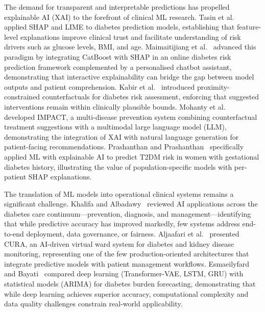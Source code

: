 \documentclass[conference]{IEEEtran}
\begin{document}
The demand for transparent and interpretable predictions has propelled explainable AI (XAI) to the forefront of clinical ML research. Tasin et al.~\cite{b5} applied SHAP and LIME to diabetes prediction models, establishing that feature-level explanations improve clinical trust and facilitate understanding of risk drivers such as glucose levels, BMI, and age. Maimaitijiang et al.~\cite{b9} advanced this paradigm by integrating CatBoost with SHAP in an online diabetes risk prediction framework complemented by a personalised chatbot assistant, demonstrating that interactive explainability can bridge the gap between model outputs and patient comprehension. Kabir et al.~\cite{b10} introduced proximity-constrained counterfactuals for diabetes risk assessment, enforcing that suggested interventions remain within clinically plausible bounds. Mohanty et al.~\cite{b11} developed IMPACT, a multi-disease prevention system combining counterfactual treatment suggestions with a multimodal large language model (LLM), demonstrating the integration of XAI with natural language generation for patient-facing recommendations. Prashanthan and Prashanthan~\cite{b12} specifically applied ML with explainable AI to predict T2DM risk in women with gestational diabetes history, illustrating the value of population-specific models with per-patient SHAP explanations.

The translation of ML models into operational clinical systems remains a significant challenge. Khalifa and Albadawy~\cite{b2} reviewed AI applications across the diabetes care continuum---prevention, diagnosis, and management---identifying that while predictive accuracy has improved markedly, few systems address end-to-end deployment, data governance, or fairness. Aljaafari et al.~\cite{b13} presented CURA, an AI-driven virtual ward system for diabetes and kidney disease monitoring, representing one of the few production-oriented architectures that integrate predictive models with patient management workflows. Esmaeilyfard and Bayati~\cite{b14} compared deep learning (Transformer-VAE, LSTM, GRU) with statistical models (ARIMA) for diabetes burden forecasting, demonstrating that while deep learning achieves superior accuracy, computational complexity and data quality challenges constrain real-world applicability.
\end{document}
